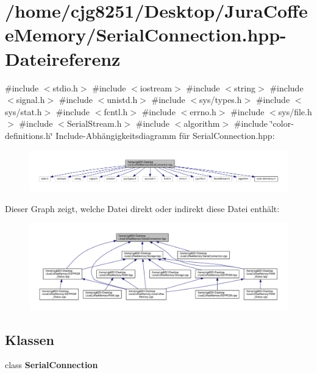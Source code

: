 \section{/home/cjg8251/\+Desktop/\+Jura\+Coffee\+Memory/\+Serial\+Connection.hpp-\/\+Dateireferenz}
\label{_serial_connection_8hpp}
{\ttfamily \#include $<$stdio.\+h$>$}\newline
{\ttfamily \#include $<$iostream$>$}\newline
{\ttfamily \#include $<$string$>$}\newline
{\ttfamily \#include $<$signal.\+h$>$}\newline
{\ttfamily \#include $<$unistd.\+h$>$}\newline
{\ttfamily \#include $<$sys/types.\+h$>$}\newline
{\ttfamily \#include $<$sys/stat.\+h$>$}\newline
{\ttfamily \#include $<$fcntl.\+h$>$}\newline
{\ttfamily \#include $<$errno.\+h$>$}\newline
{\ttfamily \#include $<$sys/file.\+h$>$}\newline
{\ttfamily \#include $<$Serial\+Stream.\+h$>$}\newline
{\ttfamily \#include $<$algorithm$>$}\newline
{\ttfamily \#include \char`\"{}color-\/definitions.\+h\char`\"{}}\newline
Include-\/\+Abhängigkeitsdiagramm für Serial\+Connection.\+hpp\+:
\nopagebreak
\begin{figure}[H]
\begin{center}
\leavevmode
\includegraphics[width=350pt]{_serial_connection_8hpp__incl}
\end{center}
\end{figure}
Dieser Graph zeigt, welche Datei direkt oder indirekt diese Datei enthält\+:
\nopagebreak
\begin{figure}[H]
\begin{center}
\leavevmode
\includegraphics[width=350pt]{_serial_connection_8hpp__dep__incl}
\end{center}
\end{figure}
\subsection*{Klassen}
\begin{DoxyCompactItemize}
\item 
class \textbf{ Serial\+Connection}
\end{DoxyCompactItemize}
